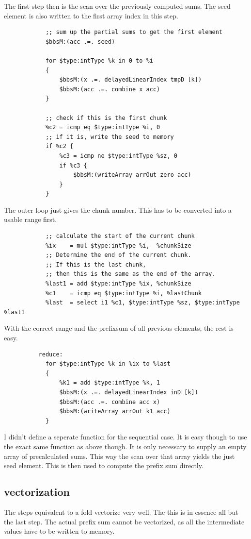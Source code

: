 \documentclass[a4paper,bibliography=totocnumbered,parskip,headsepline]{scrbook}
\begin{document}
The first step then is the scan over the previously computed sums.
The seed element is also written to the first array index in this step.
\begin{lstlisting}
            ;; sum up the partial sums to get the first element
            $bbsM:(acc .=. seed)

            for $type:intType %k in 0 to %i
            {
                $bbsM:(x .=. delayedLinearIndex tmpD [k])
                $bbsM:(acc .=. combine x acc)
            }

            ;; check if this is the first chunk
            %c2 = icmp eq $type:intType %i, 0
            ;; if it is, write the seed to memory
            if %c2 {
                %c3 = icmp ne $type:intType %sz, 0
                if %c3 {
                    $bbsM:(writeArray arrOut zero acc)
                }
            }
\end{lstlisting}
The outer loop just gives the chunk number.
This has to be converted into a usable range first.
\begin{lstlisting}
            ;; calculate the start of the current chunk
            %ix    = mul $type:intType %i,  %chunkSize
            ;; Determine the end of the current chunk.
            ;; If this is the last chunk,
            ;; then this is the same as the end of the array.
            %last1 = add $type:intType %ix, %chunkSize
            %c1    = icmp eq $type:intType %i, %lastChunk
            %last  = select i1 %c1, $type:intType %sz, $type:intType %last1
\end{lstlisting}
With the correct range and the prefixsum of all previous elements, the rest is easy.
\begin{lstlisting}
          reduce:
            for $type:intType %k in %ix to %last
            {
                %k1 = add $type:intType %k, 1
                $bbsM:(x .=. delayedLinearIndex inD [k])
                $bbsM:(acc .=. combine acc x)
                $bbsM:(writeArray arrOut k1 acc)
            }
\end{lstlisting}

I didn't define a seperate function for the sequential case.
It is easy though to use the exact same function as above though.
It is only necessary to supply an empty array of precalculated sums.
This way the scan over that array yields the just seed element.
This is then used to compute the prefix sum directly.

\subsection{vectorization}
The steps equivalent to a fold vectorize very well.
The this is in essence all but the last step.
The actual prefix sum cannot be vectorized, as all the intermediate values have to be written to memory.
\end{document}
